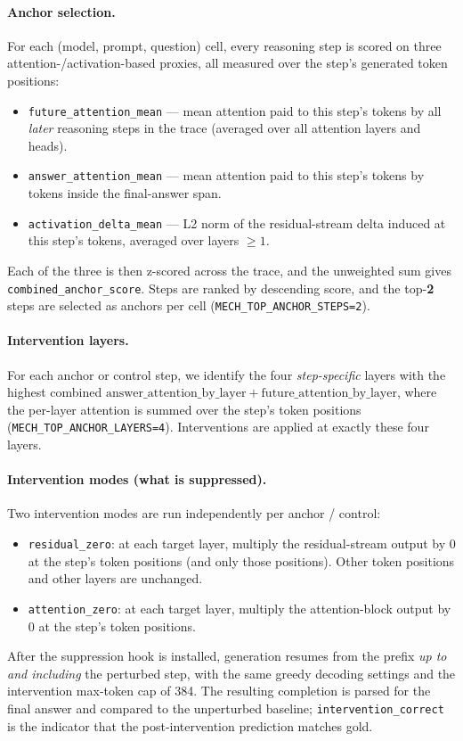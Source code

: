 \documentclass{article}
\theoremstyle{plain}
\theoremstyle{definition}
\theoremstyle{remark}
\begin{document}
\paragraph{Anchor selection.}
For each (model, prompt, question) cell, every reasoning step is
scored on three attention-/activation-based proxies, all measured
over the step's generated token positions:
\begin{itemize}
\item \texttt{future\_attention\_mean} --- mean attention paid to this
  step's tokens by all \emph{later} reasoning steps in the trace
  (averaged over all attention layers and heads).
\item \texttt{answer\_attention\_mean} --- mean attention paid to this
  step's tokens by tokens inside the final-answer span.
\item \texttt{activation\_delta\_mean} --- L2 norm of the residual-stream
  delta induced at this step's tokens, averaged over layers $\geq 1$.
\end{itemize}
Each of the three is then z-scored across the trace, and the
unweighted sum gives \texttt{combined\_anchor\_score}. Steps are ranked
by descending score, and the top-\textbf{2} steps are selected as
anchors per cell (\texttt{MECH\_TOP\_ANCHOR\_STEPS=2}).

\paragraph{Intervention layers.}
For each anchor or control step, we identify the four
\emph{step-specific} layers with the highest combined
$\mathrm{answer\_attention\_by\_layer} +
\mathrm{future\_attention\_by\_layer}$, where the per-layer attention
is summed over the step's token positions
(\texttt{MECH\_TOP\_ANCHOR\_LAYERS=4}). Interventions are applied at
exactly these four layers.

\paragraph{Intervention modes (what is suppressed).}
Two intervention modes are run independently per anchor / control:
\begin{itemize}
\item \texttt{residual\_zero}: at each target layer, multiply the
  residual-stream output by $0$ at the step's token positions
  (and only those positions). Other token positions and other
  layers are unchanged.
\item \texttt{attention\_zero}: at each target layer, multiply the
  attention-block output by $0$ at the step's token positions.
\end{itemize}
After the suppression hook is installed, generation resumes from the
prefix \emph{up to and including} the perturbed step, with the same
greedy decoding settings and the intervention max-token cap of 384.
The resulting completion is parsed for the final answer and compared
to the unperturbed baseline; \texttt{intervention\_correct} is the
indicator that the post-intervention prediction matches gold.
\end{document}
